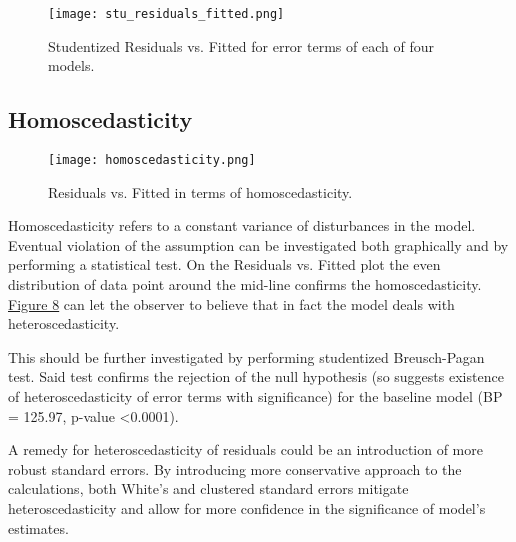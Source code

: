 \documentclass{article}
\begin{document}
\begin{figure}[htp]
    \caption{Studentized Residuals vs. Fitted for error terms of each of four models.}
    \centering
    \texttt{[image: stu\_residuals\_fitted.png]}
    \label{fig:sturesidualsfitted}
\end{figure}

\subsection{Homoscedasticity}

\begin{figure}[htp]
    \caption{Residuals vs. Fitted in terms of homoscedasticity.}
    \centering
    \texttt{[image: homoscedasticity.png]}
    \label{fig:homoscedasticity}
\end{figure}

Homoscedasticity refers to a constant variance of disturbances in the model. Eventual violation of the assumption can be investigated both graphically and by performing a statistical test. On the Residuals vs. Fitted plot the even distribution of data point around the mid-line confirms the homoscedasticity. \hyperref[fig:homoscedasticity]{Figure 8} can let the observer to believe that in fact the model deals with heteroscedasticity. 

This should be further investigated by performing studentized Breusch-Pagan test. Said test confirms the rejection of the null hypothesis (so suggests existence of heteroscedasticity of error terms with significance) for the baseline model (BP = 125.97, p-value \textless 0.0001).

A remedy for heteroscedasticity of residuals could be an introduction of more robust standard errors. By introducing more conservative approach to the calculations, both White's and clustered standard errors mitigate heteroscedasticity and allow for more confidence in the significance of model's estimates. 
\end{document}

